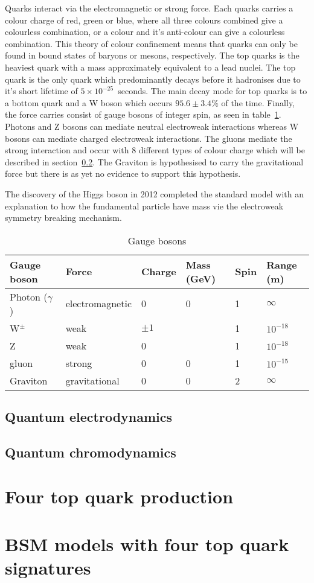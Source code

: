 Quarks interact via the electromagnetic or strong force. Each quarks carries a colour charge of red, green or blue, where all three colours combined give a colourless combination, or a colour and it's anti-colour can give a colourless combination. This theory of colour confinement means that quarks can only be found in bound states of baryons or mesons, respectively. 
The top quarks is the heaviest quark with a mass approximately equivalent to a lead nuclei. The top quark is the only quark which predominantly decays before it hadronises due to it's short lifetime of $5\times10^{-25}$~seconds. The main decay mode for top quarks is to a bottom quark and a W boson which occurs $95.6\pm3.4\%$ of the time.
Finally, the force carries consist of gauge bosons of integer spin, as seen in table~\ref{table:SMbosons}. Photons and Z bosons can mediate neutral electroweak interactions whereas W bosons can mediate charged electroweak interactions. The gluons mediate the strong interaction and occur with 8 different types of colour charge which will be described in section~\ref{subsec:QCD}. 
The Graviton is hypothesised to carry the gravitational force but there is as yet no evidence to support this hypothesis.

The discovery of the Higgs boson in 2012 completed the standard model with an explanation to how the fundamental particle have mass vie the electroweak symmetry breaking mechanism.


\begin{table}[ht!]
\centering
\caption{Gauge bosons}
\footnotesize
\label{table:SMbosons}
\begin{tabular}{|l|l|l|l|l|l|}
\hline
Gauge boson                       & Force           & Charge & Mass (GeV) & Spin & Range (m)  \\ \hline \hline
Photon ($\gamma$)                 & electromagnetic & 0      & 0          & 1    & $\infty$   \\ \hline
W$^{\pm}$                         & weak            & $\pm1$ &            & 1    & $10^{-18}$ \\ \hline
Z                                 & weak            & 0      &            & 1    & $10^{-18}$ \\ \hline
gluon                             & strong          & 0      & 0          & 1    & $10^{-15}$ \\ \hline
Graviton\footnote\{hypothesised\} & gravitational   & 0      & 0          & 2    & $\infty$   \\ \hline
\end{tabular}
\end{table}

\subsection{Quantum electrodynamics}

\subsection{Quantum chromodynamics}
\label{subsec:QCD}

\section{Four top quark production}

\section{BSM models with four top quark signatures}